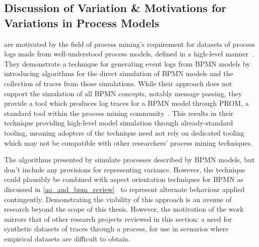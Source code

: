\subsection{Discussion of Variation \& Motivations for Variations in Process Models}\label{subsec:variation_sm_motivations}


\citeauthor{ExecutableBPMNMitsyuk} are motivated by the field of process
mining's requirement for datasets of process logs made from well-understood
process models, defined in a high-level manner~\cite{ExecutableBPMNMitsyuk}.
They demonstrate a technique for generating event logs from BPMN models by
introducing algorithms for the direct simulation of BPMN models and the
collection of traces from those simulations. While their approach does not
support the simulation of all BPMN concepts, notably message passing, they
provide a tool which produces log traces for a BPMN model through PROM, a
standard tool within the process mining community~\cite{van2005prom}. This
results in their technique providing high-level model simulation through
already-standard tooling, meaning adopters of the technique need not rely on
dedicated tooling which may not be compatible with other researchers' process
mining techniques.

The algorithms presented by \citeauthor{ExecutableBPMNMitsyuk} simulate
processes described by BPMN models, but don't include any provisions for
representing variance. However, the technique could plausibly%
be combined with
aspect orientation techniques for BPMN as discussed in
\cref{ao_and_bpm_review}~\cite{charfi2010AO4BPMN,Cappelli_AOBPM} to represent
alternate behaviour applied contingently. Demonstrating the viability of this
approach is an avenue of research beyond the scope of this thesis. However, the
motivation of the work mirrors that of other research projects reviewed in this
section: a need for synthetic datasets of traces through a process, for use in
scenarios where empirical datasets are difficult to obtain.

